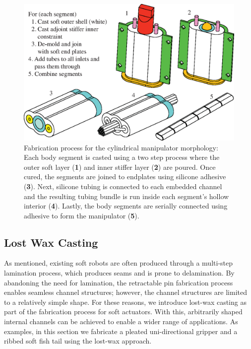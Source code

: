\begin{figure}[htb]
\centering
\includegraphics[width=\columnwidth]{figures/fabrication/fab_cylindrical_process.eps}
\caption[Fabrication process for the cylindrical manipulator morphology]{Fabrication process for the cylindrical manipulator morphology: Each body segment is casted using a two step process where the outer soft layer (\textbf{1}) and inner stiffer layer (\textbf{2}) are poured. Once cured, the segments are joined to endplates using silicone adhesive (\textbf{3}). Next, silicone tubing is connected to each embedded channel and the resulting tubing bundle is run inside each segment's hollow interior (\textbf{4}). Lastly, the body segments are serially connected using adhesive to form the manipulator (\textbf{5}).}
\label{fig:cylindrical_fab}
\end{figure}

\subsection{Lost Wax Casting}
\label{subsec:Fabrication, Lost Wax Casting}
As mentioned, existing soft robots are often produced through a multi-step lamination process, which produces seams and is prone to delamination.
By abandoning the need for lamination, the retractable pin fabrication process enables seamless channel structures; however, the channel structures are limited to a relatively simple shape.
%
For these reasons, we introduce lost-wax casting as part of the fabrication process for soft actuators.
%
With this, arbitrarily shaped internal channels can be achieved to enable a wider range of applications.
%
As examples, in this section we fabricate a pleated uni-directional gripper and a ribbed soft fish tail using the lost-wax approach.

